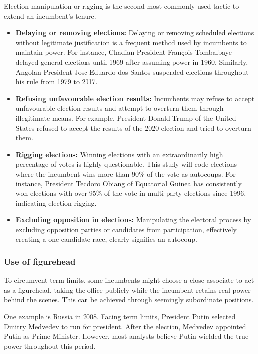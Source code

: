 \documentclass[
  12pt,
]{report}
\begin{document}
Election manipulation or rigging is the second most commonly used tactic
to extend an incumbent's tenure.

\begin{itemize}
\item
  \textbf{Delaying or removing elections:} Delaying or removing
  scheduled elections without legitimate justification is a frequent
  method used by incumbents to maintain power. For instance, Chadian
  President François Tombalbaye delayed general elections until 1969
  after assuming power in 1960. Similarly, Angolan President José
  Eduardo dos Santos suspended elections throughout his rule from 1979
  to 2017.
\item
  \textbf{Refusing unfavourable election results:} Incumbents may refuse
  to accept unfavourable election results and attempt to overturn them
  through illegitimate means. For example, President Donald Trump of the
  United States refused to accept the results of the 2020 election and
  tried to overturn them.
\item
  \textbf{Rigging elections:} Winning elections with an extraordinarily
  high percentage of votes is highly questionable. This study will code
  elections where the incumbent wins more than 90\% of the vote as
  autocoups. For instance, President Teodoro Obiang of Equatorial Guinea
  has consistently won elections with over 95\% of the vote in
  multi-party elections since 1996, indicating election rigging.
\item
  \textbf{Excluding opposition in elections:} Manipulating the electoral
  process by excluding opposition parties or candidates from
  participation, effectively creating a one-candidate race, clearly
  signifies an autocoup.
\end{itemize}

\subsubsection*{\texorpdfstring{\textbf{Use of
figurehead}}{Use of figurehead}}\label{use-of-figurehead}

To circumvent term limits, some incumbents might choose a close
associate to act as a figurehead, taking the office publicly while the
incumbent retains real power behind the scenes. This can be achieved
through seemingly subordinate positions.

One example is Russia in 2008. Facing term limits, President Putin
selected Dmitry Medvedev to run for president. After the election,
Medvedev appointed Putin as Prime Minister. However, most analysts
believe Putin wielded the true power throughout this period.
\end{document}
